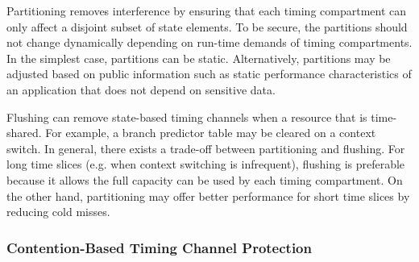 Partitioning removes interference by ensuring that each timing compartment can
only affect a disjoint subset of state elements. To be secure, the partitions
should not change dynamically depending on run-time demands of timing compartments.
In the simplest case, partitions can be static. Alternatively, partitions may
be adjusted based on public information such as static performance characteristics
of an application that does not depend on sensitive data.


Flushing can remove state-based timing channels when a resource that is time-shared.
For example, a branch predictor table may be cleared on a context switch.
In general, there exists a trade-off between partitioning and flushing.
For long time slices (e.g. when context switching is infrequent), 
flushing is preferable because it allows the full capacity can be used by
each timing compartment. On the other hand, partitioning may
offer better performance for short time slices by reducing cold misses.

\subsubsection{Contention-Based Timing Channel Protection}

